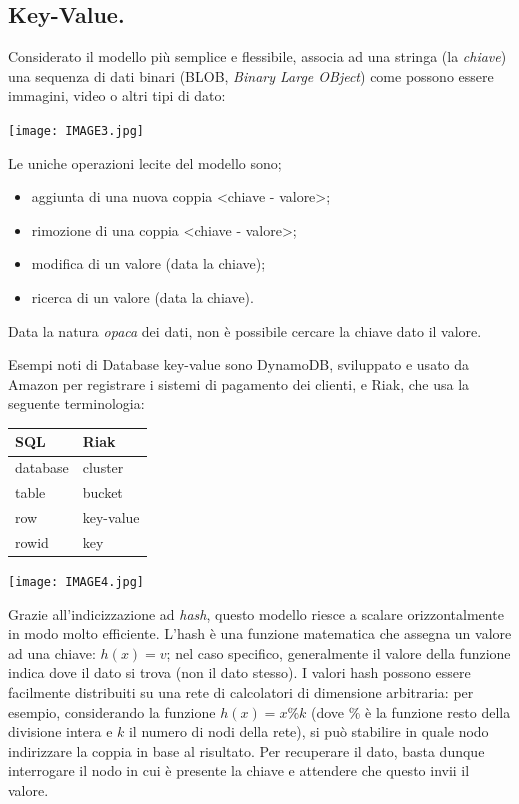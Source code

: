 \documentclass[a4page, 11pt]{article}
\begin{document}
\subsection{Key-Value.}
Considerato il modello più semplice e flessibile, associa ad una stringa (la \textit{chiave}) una sequenza di dati binari (BLOB, \textit{Binary Large OBject}) come possono essere immagini, video o altri tipi di dato:
\begin{center}
  \texttt{[image: IMAGE3.jpg]}
\end{center}
Le uniche operazioni lecite del modello sono;
\begin{itemize}
\item aggiunta di una nuova coppia \textless{}chiave - valore\textgreater{};
\item rimozione di una coppia \textless{}chiave - valore\textgreater{};
\item modifica di un valore (data la chiave);
\item ricerca di un valore (data la chiave).
\end{itemize}
Data la natura \textit{opaca} dei dati, non è possibile cercare la chiave dato il valore.

Esempi noti di Database key-value sono DynamoDB, sviluppato e usato da Amazon per registrare i sistemi di pagamento dei clienti, e Riak, che usa la seguente terminologia:
\begin{center}
  \begin{minipage}[b]{0.4\textwidth}
    \begin{tabular}{|l|l|}
      \hline
      \textbf{SQL} & \textbf{Riak}\\ \hline
      database & cluster \\ \hline
      table & bucket \\ \hline
      row & key-value\\ \hline
      rowid & key\\ \hline
    \end{tabular}
  \end{minipage}
  \begin{minipage}{.5\textwidth}\centering
    \texttt{[image: IMAGE4.jpg]}
  \end{minipage}
\end{center}

Grazie all'indicizzazione ad \textit{hash}, questo modello riesce a scalare orizzontalmente in modo molto efficiente.
L'hash è una funzione matematica che assegna un valore ad una chiave: $h(x) = v$; nel caso specifico, generalmente il valore della funzione indica dove il dato si trova (non il dato stesso).
I valori hash possono essere facilmente distribuiti su una rete di calcolatori di dimensione arbitraria: per esempio, considerando la funzione $h(x) = x \% k$ (dove $\%$ è la funzione resto della divisione intera e $k$ il numero di nodi della rete), si può stabilire in quale nodo indirizzare la coppia in base al risultato.
Per recuperare il dato, basta dunque interrogare il nodo in cui è presente la chiave e attendere che questo invii il valore.
\end{document}
